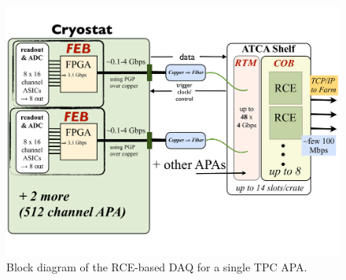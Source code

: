 


\begin{figure}[p]
\includegraphics[scale=0.6,angle=90]{LBNE-DAQ-BlockDiagram.pdf}
\caption{Block diagram of the RCE-based DAQ for a single TPC APA.}
\label{fig:blockDiag}
\end{figure} 

